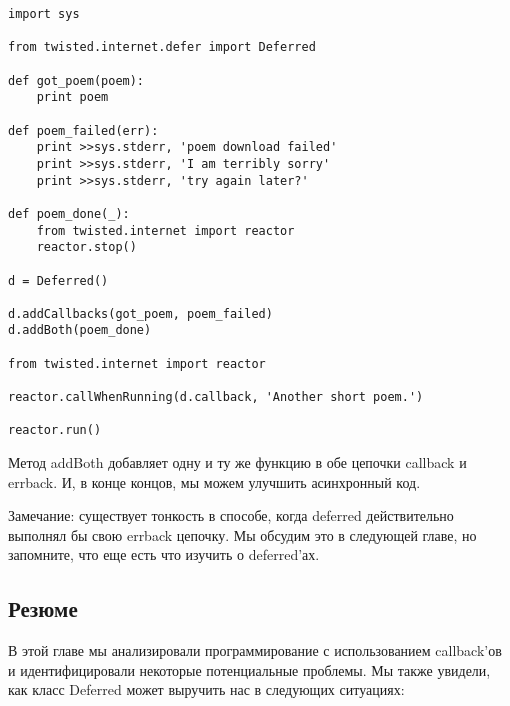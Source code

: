  \begin{verbatim}
import sys

from twisted.internet.defer import Deferred

def got_poem(poem):
    print poem

def poem_failed(err):
    print >>sys.stderr, 'poem download failed'
    print >>sys.stderr, 'I am terribly sorry'
    print >>sys.stderr, 'try again later?'

def poem_done(_):
    from twisted.internet import reactor
    reactor.stop()

d = Deferred()

d.addCallbacks(got_poem, poem_failed)
d.addBoth(poem_done)

from twisted.internet import reactor

reactor.callWhenRunning(d.callback, 'Another short poem.')

reactor.run()
\end{verbatim} 

Метод addBoth добавляет одну и ту же функцию в обе цепочки 
callback и errback. И, в конце концов, мы можем улучшить асинхронный код.


Замечание: существует тонкость в способе, когда 
deferred действительно выполнял бы свою errback цепочку. 
Мы обсудим это в следующей главе, но запомните, что еще есть что 
изучить о deferred'ах.


\subsection{Резюме}

В этой главе мы анализировали программирование с использованием 
callback'ов и идентифицировали некоторые потенциальные проблемы. 
Мы также увидели, как класс Deferred может выручить нас в следующих 
ситуациях:

